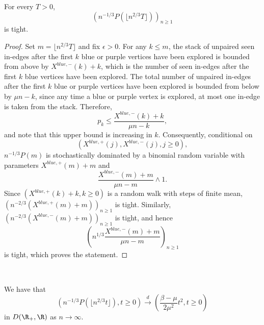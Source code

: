  \begin{lemma}\label{lemma.tightnesssurplus edges}
 For every $T>0$, $$\left(n^{-1/3}P\left(\lfloor  n^{2/3}T\rfloor \right) \right)_{n\geq 1}$$ 
 is tight.
 \end{lemma}
 \begin{proof}
Set $m=\lfloor  n^{2/3}T\rfloor$ and fix $\epsilon>0$. For any $k\leq m$, the stack of unpaired seen in-edges after the first $k$ blue or purple vertices have been explored is bounded from above by $X^{blue,-}(k)+k$, which is the number of seen in-edges after the first $k$ blue vertices have been explored. The total number of unpaired in-edges after the first $k$ blue or purple vertices have been explored is bounded from below by $\mu n - k$, since any time a blue or purple vertex is explored, at most one in-edge is taken from the stack. Therefore, $$p_k\leq \frac{X^{blue,-}(k)+k}{\mu n - k},$$
and note that this upper bound is increasing in $k$. Consequently, conditional on $$(X^{blue,+}(j),X^{blue,-}(j),j\geq 0),$$ $n^{-1/3}P(m)$ is stochastically dominated by a binomial random variable with parameters  $X^{blue,+}(m)+m$ and $$\frac{X^{blue,-}(m)+m}{\mu n - m}\wedge 1.$$
Since $(X^{blue,+}(k)+k,k\geq 0)$ is a random walk with steps of finite mean, $\left(n^{-2/3}(X^{blue,+}(m)+m)\right)_{n\geq 1}$ is tight. Similarly, $\left(n^{-2/3}(X^{blue,-}(m)+m)\right)_{n\geq 1}$ is tight, and hence 
$$\left(n^{1/3} \frac{X^{blue,-}(m)+m}{\mu n - m}\right)_{n\geq 1}$$ is tight, which proves the statement.
\end{proof}\\
\begin{lemma}\label{lemma.convergenceQandP}
We have that 
$$\left(n^{-1/3}P(\lfloor n^{2/3}t\rfloor), t \geq 0\right)\overset{d}{\to} \left(\frac{\beta - \mu}{2\mu^2} t^2, t\geq 0\right)$$
in $D(\R_+,\R)$ as $n\to \infty$.

\end{lemma}
